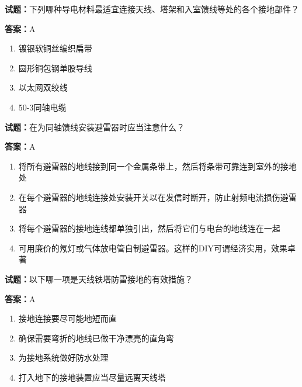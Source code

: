 \documentclass{ctexbook}
\begin{document}
\textbf{试题：}下列哪种导电材料最适宜连接天线、塔架和入室馈线等处的各个接地部件？ 

\textbf{答案：}A 

\begin{enumerate}[leftmargin=3em]
  \item 镀银软铜丝编织扁带 

  \item 圆形铜包钢单股导线 

  \item 以太网双绞线 

  \item 50-3同轴电缆 

\end{enumerate}






\vspace{1em}

\textbf{试题：}在为同轴馈线安装避雷器时应当注意什么？ 

\textbf{答案：}A 

\begin{enumerate}[leftmargin=3em]
  \item 将所有避雷器的地线接到同一个金属条带上，然后将条带可靠连到室外的接地处 

  \item 在每个避雷器的地线连接处安装开关以在发信时断开，防止射频电流损伤避雷器 

  \item 将每个避雷器的接地连线都单独引出，然后将它们与电台的地线连在一起 

  \item 可用廉价的氖灯或气体放电管自制避雷器。这样的DIY可谓经济实用，效果卓著 

\end{enumerate}





\vspace{1em}

\textbf{试题：}以下哪一项是天线铁塔防雷接地的有效措施？ 

\textbf{答案：}A 

\begin{enumerate}[leftmargin=3em]
  \item 接地连接要尽可能地短而直 

  \item 确保需要弯折的地线已做干净漂亮的直角弯 

  \item 为接地系统做好防水处理 

  \item 打入地下的接地装置应当尽量远离天线塔 

\end{enumerate}
\end{document}
